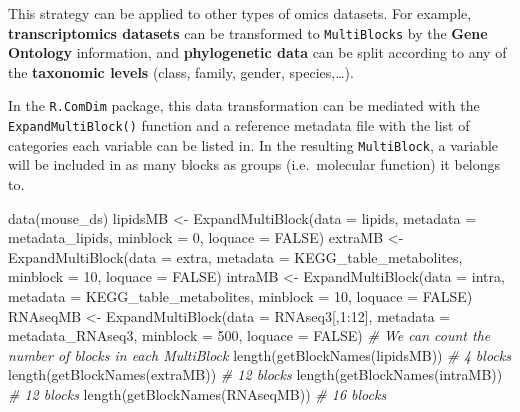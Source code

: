 \documentclass[
]{book}
\newenvironment{Shaded}{\begin{snugshade}}{\end{snugshade}}
\newcommand{\AttributeTok}[1]{\textcolor[rgb]{0.77,0.63,0.00}{#1}}
\newcommand{\CommentTok}[1]{\textcolor[rgb]{0.56,0.35,0.01}{\textit{#1}}}
\newcommand{\ConstantTok}[1]{\textcolor[rgb]{0.00,0.00,0.00}{#1}}
\newcommand{\DecValTok}[1]{\textcolor[rgb]{0.00,0.00,0.81}{#1}}
\newcommand{\FunctionTok}[1]{\textcolor[rgb]{0.00,0.00,0.00}{#1}}
\newcommand{\NormalTok}[1]{#1}
\newcommand{\OtherTok}[1]{\textcolor[rgb]{0.56,0.35,0.01}{#1}}
\newcommand{\SpecialCharTok}[1]{\textcolor[rgb]{0.00,0.00,0.00}{#1}}
\begin{document}
This strategy can be applied to other types of omics datasets. For example,
\textbf{transcriptomics datasets} can be transformed to \texttt{MultiBlocks} by the
\textbf{Gene Ontology} information, and \textbf{phylogenetic data} can be split according
to any of the \textbf{taxonomic levels} (class, family, gender, species,\ldots).

In the \texttt{R.ComDim} package, this data transformation can be mediated with the
\texttt{ExpandMultiBlock()} function and a reference metadata file with the list of
categories each variable can be listed in. In the resulting \texttt{MultiBlock}, a
variable will be included in as many blocks as groups (i.e.~molecular function)
it belongs to.

\begin{Shaded}
\begin{Highlighting}[]
\FunctionTok{data}\NormalTok{(mouse\_ds)}
\NormalTok{lipidsMB }\OtherTok{\textless{}{-}} \FunctionTok{ExpandMultiBlock}\NormalTok{(}\AttributeTok{data =}\NormalTok{ lipids, }\AttributeTok{metadata =}\NormalTok{ metadata\_lipids,}
                             \AttributeTok{minblock =} \DecValTok{0}\NormalTok{, }\AttributeTok{loquace =} \ConstantTok{FALSE}\NormalTok{)}
\NormalTok{extraMB }\OtherTok{\textless{}{-}} \FunctionTok{ExpandMultiBlock}\NormalTok{(}\AttributeTok{data =}\NormalTok{ extra, }\AttributeTok{metadata =}\NormalTok{ KEGG\_table\_metabolites,}
                            \AttributeTok{minblock =} \DecValTok{10}\NormalTok{, }\AttributeTok{loquace =} \ConstantTok{FALSE}\NormalTok{)}
\NormalTok{intraMB }\OtherTok{\textless{}{-}} \FunctionTok{ExpandMultiBlock}\NormalTok{(}\AttributeTok{data =}\NormalTok{ intra, }\AttributeTok{metadata =}\NormalTok{ KEGG\_table\_metabolites,}
                            \AttributeTok{minblock =} \DecValTok{10}\NormalTok{, }\AttributeTok{loquace =} \ConstantTok{FALSE}\NormalTok{)}
\NormalTok{RNAseqMB }\OtherTok{\textless{}{-}} \FunctionTok{ExpandMultiBlock}\NormalTok{(}\AttributeTok{data =}\NormalTok{ RNAseq3[,}\DecValTok{1}\SpecialCharTok{:}\DecValTok{12}\NormalTok{],}
                             \AttributeTok{metadata =}\NormalTok{ metadata\_RNAseq3,}
                             \AttributeTok{minblock =} \DecValTok{500}\NormalTok{, }\AttributeTok{loquace =} \ConstantTok{FALSE}\NormalTok{)}
\CommentTok{\# We can count the number of blocks in each MultiBlock}
\FunctionTok{length}\NormalTok{(}\FunctionTok{getBlockNames}\NormalTok{(lipidsMB)) }\CommentTok{\# 4 blocks}
\FunctionTok{length}\NormalTok{(}\FunctionTok{getBlockNames}\NormalTok{(extraMB))  }\CommentTok{\# 12 blocks}
\FunctionTok{length}\NormalTok{(}\FunctionTok{getBlockNames}\NormalTok{(intraMB))  }\CommentTok{\# 12 blocks}
\FunctionTok{length}\NormalTok{(}\FunctionTok{getBlockNames}\NormalTok{(RNAseqMB)) }\CommentTok{\# 16 blocks}
\end{Highlighting}
\end{Shaded}
\end{document}
